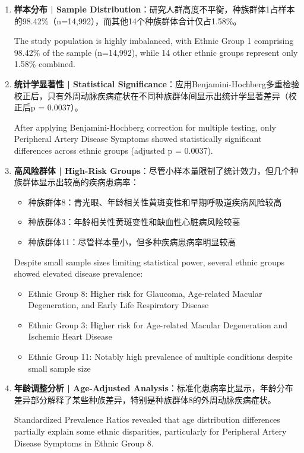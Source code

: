 \documentclass[12pt,a4paper]{article}
\begin{document}
\begin{enumerate}[leftmargin=*]
    \item \textbf{样本分布 | Sample Distribution}：研究人群高度不平衡，种族群体1占样本的98.42\%（n=14,992），而其他14个种族群体合计仅占1.58\%。
    
    The study population is highly imbalanced, with Ethnic Group 1 comprising 98.42\% of the sample (n=14,992), while 14 other ethnic groups represent only 1.58\% combined.
    
    \item \textbf{统计学显著性 | Statistical Significance}：应用Benjamini-Hochberg多重检验校正后，只有外周动脉疾病症状在不同种族群体间显示出统计学显著差异（校正后p = 0.0037）。
    
    After applying Benjamini-Hochberg correction for multiple testing, only Peripheral Artery Disease Symptoms showed statistically significant differences across ethnic groups (adjusted p = 0.0037).
    
    \item \textbf{高风险群体 | High-Risk Groups}：尽管小样本量限制了统计效力，但几个种族群体显示出较高的疾病患病率：
    \begin{itemize}
        \item 种族群体8：青光眼、年龄相关性黄斑变性和早期呼吸道疾病风险较高
        \item 种族群体3：年龄相关性黄斑变性和缺血性心脏病风险较高
        \item 种族群体11：尽管样本量小，但多种疾病患病率明显较高
    \end{itemize}
    
    Despite small sample sizes limiting statistical power, several ethnic groups showed elevated disease prevalence:
    \begin{itemize}
        \item Ethnic Group 8: Higher risk for Glaucoma, Age-related Macular Degeneration, and Early Life Respiratory Disease
        \item Ethnic Group 3: Higher risk for Age-related Macular Degeneration and Ischemic Heart Disease
        \item Ethnic Group 11: Notably high prevalence of multiple conditions despite small sample size
    \end{itemize}
    
    \item \textbf{年龄调整分析 | Age-Adjusted Analysis}：标准化患病率比显示，年龄分布差异部分解释了某些种族差异，特别是种族群体8的外周动脉疾病症状。
    
    Standardized Prevalence Ratios revealed that age distribution differences partially explain some ethnic disparities, particularly for Peripheral Artery Disease Symptoms in Ethnic Group 8.
\end{enumerate}
\end{document}
